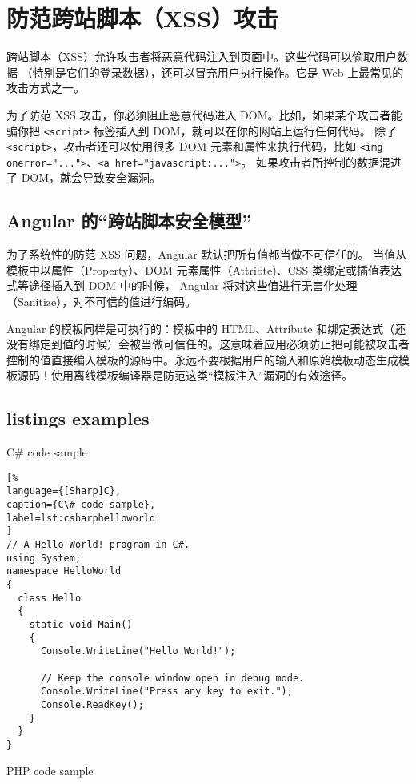 \documentclass{progbookcn}
\begin{document}
\section{防范跨站脚本（XSS）攻击}

跨站脚本（XSS）允许攻击者将恶意代码注入到页面中。这些代码可以偷取用户数据 （特别是它们的登录数据），还可以冒充用户执行操作。它是 Web 上最常见的攻击方式之一。

为了防范 XSS 攻击，你必须阻止恶意代码进入 DOM。比如，如果某个攻击者能骗你把 \verb|<script>| 标签插入到 DOM，就可以在你的网站上运行任何代码。 除了 \verb|<script>|，攻击者还可以使用很多 DOM 元素和属性来执行代码，比如 \verb|<img onerror="...">|、\verb|<a href="javascript:...">|。 如果攻击者所控制的数据混进了 DOM，就会导致安全漏洞。

\subsection{Angular 的``跨站脚本安全模型''}

为了系统性的防范 XSS 问题，Angular 默认把所有值都当做不可信任的。 当值从模板中以属性（Property）、DOM 元素属性（Attribte)、CSS 类绑定或插值表达式等途径插入到 DOM 中的时候， Angular 将对这些值进行无害化处理（Sanitize），对不可信的值进行编码。

Angular 的模板同样是可执行的：模板中的 HTML、Attribute 和绑定表达式（还没有绑定到值的时候）会被当做可信任的。这意味着应用必须防止把可能被攻击者控制的值直接编入模板的源码中。永远不要根据用户的输入和原始模板动态生成模板源码！使用离线模板编译器是防范这类``模板注入''漏洞的有效途径。

\subsection{listings examples}

\noindent{}C\# code sample

\begin{lstlisting}[%
language={[Sharp]C},
caption={C\# code sample},
label=lst:csharphelloworld
]
// A Hello World! program in C#.
using System;
namespace HelloWorld
{
  class Hello 
  {
    static void Main() 
    {
      Console.WriteLine("Hello World!");
      
      // Keep the console window open in debug mode.
      Console.WriteLine("Press any key to exit.");
      Console.ReadKey();
    }
  }
}
\end{lstlisting}

\noindent{}PHP code sample
\end{document}
